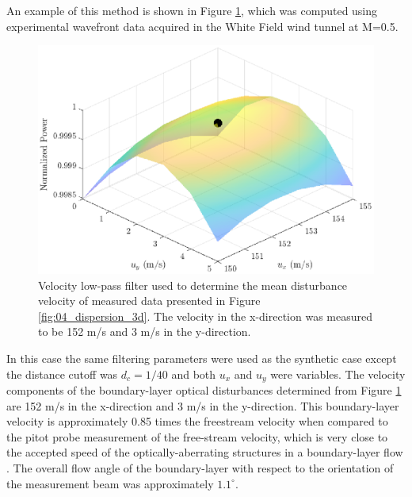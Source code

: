 An example of this method is shown in Figure \ref{fig:06_filter_velocity_real}, which was computed using experimental wavefront data acquired in the White Field wind tunnel at M=0.5.
\begin{figure}
 \centering
 \includegraphics{../matlab/06_single_sensor_filtering/filter_velocity_real.eps}
 \caption{Velocity low-pass filter used to determine the mean disturbance velocity of measured data presented in Figure \ref{fig:04_dispersion_3d}.  The velocity in the x-direction was measured to be 152 m/s and 3 m/s in the y-direction.}
 \label{fig:06_filter_velocity_real}
\end{figure}
In this case the same filtering parameters were used as the synthetic case except the distance cutoff was $d_c=1/40$ and both $u_x$ and $u_y$ were variables.
The velocity components of the boundary-layer optical disturbances determined from Figure \ref{fig:06_filter_velocity_real} are 152 m/s in the x-direction and 3 m/s in the y-direction.
This boundary-layer velocity is approximately 0.85 times the freestream velocity when compared to the pitot probe measurement of the free-stream velocity, which is very close to the accepted speed of the optically-aberrating structures in a boundary-layer flow \cite{Gordeyev-2014-jcJndkHM}.
The overall flow angle of the boundary-layer with respect to the orientation of the measurement beam was approximately $1.1^\circ$.

